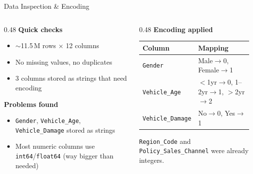 \documentclass[aspectratio=169, 10pt]{beamer}
\begin{document}
\begin{frame}{Data Inspection \& Encoding}
  \begin{columns}[T]
    \begin{column}{0.48\textwidth}
      \textbf{Quick checks}
      \begin{itemize}
        \item $\sim$11.5\,M rows $\times$ 12 columns
        \item No missing values, no duplicates
        \item 3 columns stored as strings that need encoding
      \end{itemize}

      \vspace{0.3cm}
      \textbf{Problems found}
      \begin{itemize}
        \item \texttt{Gender}, \texttt{Vehicle\_Age}, \texttt{Vehicle\_Damage} stored as strings
        \item Most numeric columns use \texttt{int64}/\texttt{float64} (way bigger than needed)
      \end{itemize}
    \end{column}
    \begin{column}{0.48\textwidth}
      \textbf{Encoding applied}
      \begin{table}[h]
        \centering\small
        \begin{tabular}{@{}ll@{}}
          \toprule
          \textbf{Column} & \textbf{Mapping} \\
          \midrule
          \texttt{Gender}          & Male$\to$0, Female$\to$1 \\
          \texttt{Vehicle\_Age}    & $<$1yr$\to$0, 1--2yr$\to$1, $>$2yr$\to$2 \\
          \texttt{Vehicle\_Damage} & No$\to$0, Yes$\to$1 \\
          \bottomrule
        \end{tabular}
      \end{table}
      \texttt{Region\_Code} and \texttt{Policy\_Sales\_Channel} were already integers.
    \end{column}
  \end{columns}
\end{frame}
\end{document}
